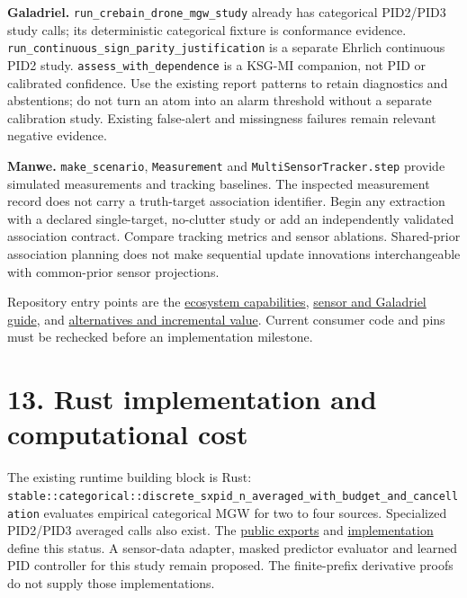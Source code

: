 \documentclass[11pt,a4paper]{article}
\let\PidSavedTexttt\texttt
\renewcommand{\texttt}[1]{\PidSavedTexttt{#1}}
\begin{document}
\textbf{Galadriel.} \texttt{run\_\allowbreak{}crebain\_\allowbreak{}drone\_\allowbreak{}mgw\_\allowbreak{}study} already has categorical PID2/PID3 study calls; its deterministic categorical fixture is conformance evidence. \texttt{run\_\allowbreak{}continuous\_\allowbreak{}sign\_\allowbreak{}parity\_\allowbreak{}justification} is a separate Ehrlich continuous PID2 study. \texttt{assess\_\allowbreak{}with\_\allowbreak{}dependence} is a KSG-MI companion, not PID or calibrated confidence. Use the existing report patterns to retain diagnostics and abstentions; do not turn an atom into an alarm threshold without a separate calibration study. Existing false-alert and missingness failures remain relevant negative evidence.

\textbf{Manwe.} \texttt{make\_\allowbreak{}scenario}, \texttt{Measurement} and \texttt{MultiSensorTracker.\allowbreak{}step} provide simulated measurements and tracking baselines. The inspected measurement record does not carry a truth-target association identifier. Begin any extraction with a declared single-target, no-clutter study or add an independently validated association contract. Compare tracking metrics and sensor ablations. Shared-prior association planning does not make sequential update innovations interchangeable with common-prior sensor projections.

Repository entry points are the \href{https://github.com/sepahead/pid-rs/blob/main/ECOSYSTEM_CAPABILITIES.md}{ecosystem capabilities}, \href{https://github.com/sepahead/pid-rs/blob/main/PID_SENSOR_PLACEMENT_AND_GALADRIEL_GUIDE.md}{sensor and Galadriel guide}, and \href{https://github.com/sepahead/pid-rs/blob/main/PID_ALTERNATIVES_AND_INCREMENTAL_VALUE.md}{alternatives and incremental value}. Current consumer code and pins must be rechecked before an implementation milestone.

\par{}

\section{13. Rust implementation and computational cost}\label{rust-implementation-and-computational-cost}

The existing runtime building block is Rust: \texttt{stable::\allowbreak{}categorical::\allowbreak{}discrete\_\allowbreak{}sxpid\_\allowbreak{}n\_\allowbreak{}averaged\_\allowbreak{}with\_\allowbreak{}budget\_\allowbreak{}and\_\allowbreak{}cancellation} evaluates empirical categorical MGW for two to four sources. Specialized PID2/PID3 averaged calls also exist. The \href{https://github.com/sepahead/pid-rs/blob/main/crates/pid-core/src/lib.rs}{public exports} and \href{https://github.com/sepahead/pid-rs/blob/main/crates/pid-core/src/sxpid.rs}{implementation} define this status. A sensor-data adapter, masked predictor evaluator and learned PID controller for this study remain proposed. The finite-prefix derivative proofs do not supply those implementations.
\end{document}
